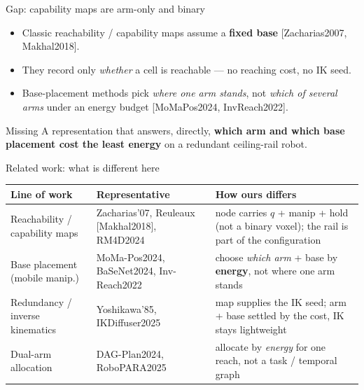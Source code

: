 \documentclass[aspectratio=169]{beamer}
\begin{document}
\begin{frame}{Gap: capability maps are arm-only and binary}
  \begin{itemize}
    \item Classic reachability / capability maps assume a \textbf{fixed base}
          [Zacharias2007, Makhal2018].
    \item They record only \emph{whether} a cell is reachable --- no reaching cost,
          no IK seed.
    \item Base-placement methods pick \emph{where one arm stands}, not \emph{which of
          several arms} under an energy budget [MoMaPos2024, InvReach2022].
  \end{itemize}
  \vfill
  \begin{alertblock}{Missing}
    A representation that answers, directly, \textbf{which arm and which base
    placement cost the least energy} on a redundant ceiling-rail robot.
  \end{alertblock}
\end{frame}

\begin{frame}{Related work: what is different here}
  \footnotesize
  \begin{tabular}{@{}p{2.6cm}p{3.5cm}p{4.6cm}@{}}
    \toprule
    Line of work & Representative & How ours differs \\
    \midrule
    Reachability / capability maps
      & Zacharias'07, Reuleaux [Makhal2018], RM4D2024
      & node carries $q$ + manip + hold (not a binary voxel); the rail is part
        of the configuration \\[2pt]
    Base placement (mobile manip.)
      & MoMa-Pos2024, BaSeNet2024, Inv-Reach2022
      & choose \emph{which arm} + base by \textbf{energy}, not where one arm stands \\[2pt]
    Redundancy / inverse kinematics
      & Yoshikawa'85, IKDiffuser2025
      & map supplies the IK seed; arm + base settled by the cost, IK stays
        lightweight \\[2pt]
    Dual-arm allocation
      & DAG-Plan2024, RoboPARA2025
      & allocate by \emph{energy} for one reach, not a task / temporal graph \\
    \bottomrule
  \end{tabular}
\end{frame}
\end{document}
